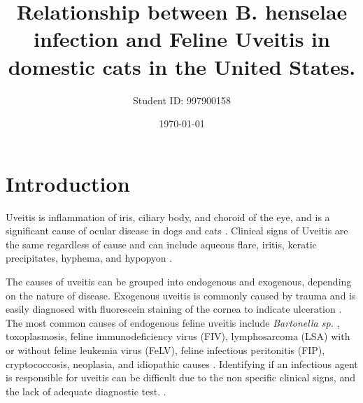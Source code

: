 \documentclass[11pt,twocolumn]{article}
\title{Relationship between B. henselae infection and Feline Uveitis in domestic cats in the United States.}
\author{Student ID: 997900158}
\date{\today}
\begin{document}

	\section{Introduction} 
		Uveitis is inflammation of iris, ciliary body, and choroid of the eye, and is a significant cause of ocular disease in dogs and cats \cite{Townsend2008}. 
		Clinical signs of Uveitis are the same regardless of cause and can include aqueous flare, iritis, keratic precipitates, hyphema, and hypopyon \cite{Powell2010}.


		The causes of uveitis can be grouped into endogenous and exogenous, depending on the nature of disease. Exogenous uveitis is commonly caused by trauma and is easily diagnosed with fluorescein staining of the cornea to indicate ulceration \cite{Fontenelle2008}.
		The most common causes of endogenous feline uveitis include \emph{Bartonella sp.} , toxoplasmosis, feline immunodeficiency virus (FIV), lymphosarcoma (LSA) with or without feline leukemia virus (FeLV), feline infectious peritonitis (FIP), cryptococcosis, neoplasia, and idiopathic causes \cite{Powell2001}.
		Identifying if an infectious agent is responsible for uveitis can be difficult due to the non specific clinical signs, and the lack of adequate diagnostic test. \cite{Fontenelle2008}.
\end{document}
